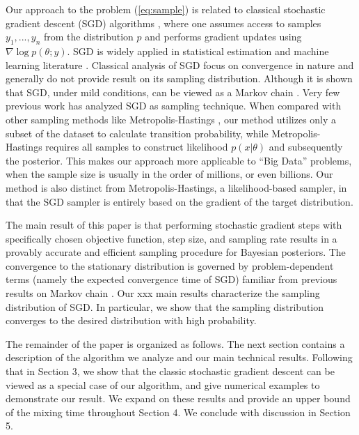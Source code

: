 \documentclass[preprint,12pt,3p]{elsarticle}
\begin{document}
Our approach to the problem (\ref{eq:sample}) is related to classical stochastic gradient descent (SGD) algorithms \citep{Robbins_A_1951,Polyak_Acceleration_1992}, where one assumes access to samples $y_1, ..., y_n$ from the distribution $p$ and performs gradient updates using $\nabla \log p(\theta ;y)$. SGD is widely applied in statistical estimation and machine learning literature \citep{lecun2012efficient,Finkel_Efficient_2008}. Classical analysis of SGD focus on convergence in nature and generally do not provide result on its sampling distribution. Although it is shown that SGD, under mild conditions, can be viewed as a Markov chain \citep{kushner2012stochastic,bach2014adaptivity}. Very few previous work has analyzed SGD as sampling technique. When compared with other sampling methods like Metropolis-Hastings \citep{Metropolis1953}, our method utilizes only a subset of the dataset to calculate transition probability, while Metropolis-Hastings requires all samples to construct likelihood $p(x|\theta)$ and subsequently the posterior. This makes our approach more applicable to ``Big Data'' problems, when the sample size is usually in the order of millions, or even billions. Our method is also distinct from Metropolis-Hastings, a likelihood-based sampler, in that the SGD sampler is entirely based on the gradient of the target distribution.

The main result of this paper is that performing stochastic gradient steps with specifically chosen objective function, step size, and sampling rate results in a provably accurate and efficient sampling procedure for Bayesian posteriors. The convergence to the stationary distribution is governed by problem-dependent terms (namely the expected convergence time of SGD) familiar from previous results on Markov chain \citep{aldous2002reversible,levin2009markov}. Our xxx main results characterize the sampling distribution of SGD. In particular, we show that the sampling distribution converges to the desired distribution with high probability.

The remainder of the paper is organized as follows. The next section contains a description of the algorithm we analyze and our main technical results. Following that in Section 3, we show that the classic stochastic gradient descent can be viewed as a special case of our algorithm, and give numerical examples to demonstrate our result. We expand on these results and provide an upper bound of the mixing time throughout Section 4. We conclude with discussion in Section 5.
\end{document}
